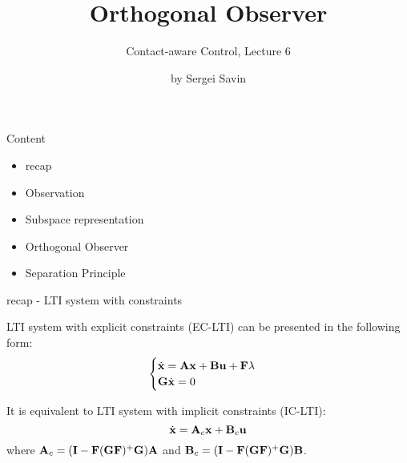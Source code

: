 \documentclass{beamer}
\title{Orthogonal Observer}
\subtitle{Contact-aware Control, Lecture 6}
\author{by Sergei Savin}
\date{\mydate}
\begin{document}
\maketitle


\begin{frame}{Content}

\begin{itemize}
\item recap
\item Observation
\item Subspace representation
\item Orthogonal Observer
\item Separation Principle
\end{itemize}

\end{frame}




\begin{frame}{recap - LTI system with constraints}
	\begin{flushleft}
		
		LTI system with explicit constraints (EC-LTI) can be presented in the following form:
		\begin{equation}
			\begin{cases}
				\dot{\mathbf{x}}=\mathbf{A}\mathbf{x}+\mathbf{B}\mathbf{u}+\mathbf{F}\lambda 
				\\
				\mathbf{G}\dot{\mathbf{x}}=0
			\end{cases}
		\end{equation}
		
		It is equivalent to LTI system with implicit constraints (IC-LTI):
		\begin{equation}
			\dot{\mathbf{x}}=\mathbf{A}_c\mathbf{x}+\mathbf{B}_c\mathbf{u}
		\end{equation}
	where $\mathbf{A}_c = (\mathbf{I}-\mathbf{F}(\mathbf{G}\mathbf{F})^+\mathbf{G})\mathbf{A}$ and $\mathbf{B}_c = (\mathbf{I}-\mathbf{F}(\mathbf{G}\mathbf{F})^+\mathbf{G})\mathbf{B}$.
	
	\end{flushleft}
\end{frame}
\end{document}
